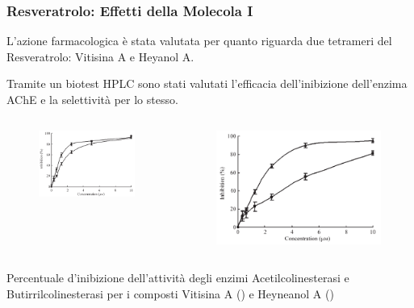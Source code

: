\documentclass[9pt]{beamer}
\begin{document}
\begin{frame}
	\frametitle{Resveratrolo: Effetti della Molecola I}
	L'azione farmacologica è stata valutata per quanto riguarda due tetrameri del Resveratrolo: Vitisina A e Heyanol A.
	
	Tramite un biotest HPLC sono stati valutati l'efficacia dell'inibizione dell'enzima AChE e la selettività per lo stesso.
	
	\begin{columns}
		\begin{column}{0.5\textwidth}
			\begin{figure}
				\includegraphics[width=\textwidth]{immagini/risache_resveratrolo.png}
			\end{figure}
		\end{column}
		\begin{column}{0.5\textwidth}
			\begin{figure}
				\includegraphics[width=\textwidth]{immagini/risbuche_resveratrolo.png}
			\end{figure}
		\end{column}
	\end{columns}
	Percentuale d'inibizione dell'attività degli enzimi Acetilcolinesterasi e Butirrilcolinesterasi per i composti Vitisina A () e Heyneanol A ()
\end{frame}
\end{document}
